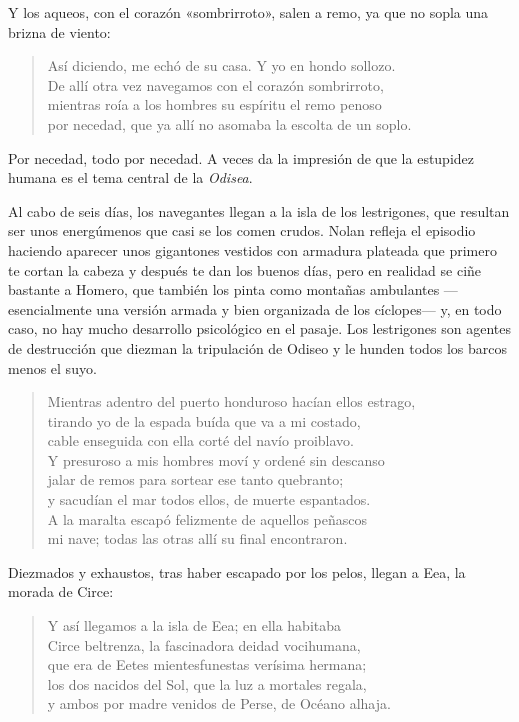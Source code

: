 \documentclass[11pt,a4paper]{article}
\begin{document}
Y los aqueos, con el corazón «sombrirroto», salen a remo, ya que no sopla una brizna de viento:

\begin{verse}
Así diciendo, me echó de su casa. Y yo en hondo sollozo.\\
De allí otra vez navegamos con el corazón sombrirroto,\\
mientras roía a los hombres su espíritu el remo penoso\\
por necedad, que ya allí no asomaba la escolta de un soplo.
\end{verse}

Por necedad, todo por necedad. A veces da la impresión de que la estupidez humana es el tema central de la \emph{Odisea}.

Al cabo de seis días, los navegantes llegan a la isla de los lestrigones, que resultan ser unos energúmenos que casi se los comen crudos. Nolan refleja el episodio haciendo aparecer unos gigantones vestidos con armadura plateada que primero te cortan la cabeza y después te dan los buenos días, pero en realidad se ciñe bastante a Homero, que también los pinta como montañas ambulantes ---esencialmente una versión armada y bien organizada de los cíclopes--- y, en todo caso, no hay mucho desarrollo psicológico en el pasaje. Los lestrigones son agentes de destrucción que diezman la tripulación de Odiseo y le hunden todos los barcos menos el suyo.

\begin{verse}
Mientras adentro del puerto honduroso hacían ellos estrago,\\
tirando yo de la espada buída que va a mi costado,\\
cable enseguida con ella corté del navío proiblavo.\\
Y presuroso a mis hombres moví y ordené sin descanso\\
jalar de remos para sortear ese tanto quebranto;\\
y sacudían el mar todos ellos, de muerte espantados.\\
A la maralta escapó felizmente de aquellos peñascos\\
mi nave; todas las otras allí su final encontraron.
\end{verse}

Diezmados y exhaustos, tras haber escapado por los pelos, llegan a Eea, la morada de Circe:

\begin{verse}
Y así llegamos a la isla de Eea; en ella habitaba\\
Circe beltrenza, la fascinadora deidad vocihumana,\\
que era de Eetes mientesfunestas verísima hermana;\\
los dos nacidos del Sol, que la luz a mortales regala,\\
y ambos por madre venidos de Perse, de Océano alhaja.
\end{verse}
\end{document}
